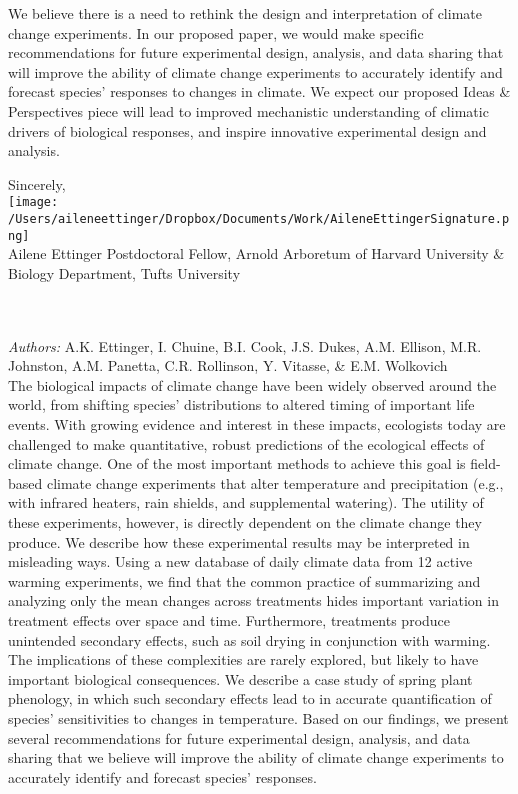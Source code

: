 \documentclass[12pt,a4paper]{letter}
\begin{document}
\begin{letter}{}
We believe there is a need to rethink the design and interpretation of climate change experiments. In our proposed paper, we would make specific recommendations for future experimental design, analysis, and data sharing that will improve the ability of climate change experiments to accurately identify and forecast species' responses to changes in climate. We expect our proposed Ideas \& Perspectives piece will lead to improved mechanistic understanding of climatic drivers of biological responses, and inspire innovative experimental design and analysis. 

Sincerely,\\

\texttt{[image: /Users/aileneettinger/Dropbox/Documents/Work/AileneEttingerSignature.png]} \\
Ailene Ettinger
Postdoctoral Fellow, Arnold Arboretum of Harvard University \& Biology Department, Tufts University

\newpage
{}\\
\\
\noindent \emph{Authors:} A.K. Ettinger, I. Chuine, B.I. Cook, J.S. Dukes, A.M. Ellison, M.R. Johnston, A.M. Panetta, C.R. Rollinson, Y. Vitasse, \& E.M. Wolkovich
\\
The biological impacts of climate change have been widely observed around the world, from shifting species' distributions to altered timing of important life events. With growing evidence and interest in these impacts, ecologists today are challenged to make quantitative, robust predictions of the ecological effects of climate change. One of the most important methods to achieve this goal is field-based climate change experiments that alter temperature and precipitation (e.g., with infrared heaters, rain shields, and supplemental watering). The utility of these experiments, however, is directly dependent on the climate change they produce. We describe how these experimental results may be interpreted in misleading ways. Using a new database of daily climate data from 12 active warming experiments, we find that the common practice of summarizing and analyzing only the mean changes across treatments hides important variation in treatment effects over space and time. Furthermore, treatments produce unintended secondary effects, such as soil drying in conjunction with warming. The implications of these complexities are rarely explored, but likely to have important biological consequences. We describe a case study of spring plant phenology, in which such secondary effects lead to in accurate quantification of species' sensitivities to changes in temperature. Based on our findings, we present several recommendations for future experimental design, analysis, and data sharing that we believe will improve the ability of climate change experiments to accurately identify and forecast species' responses.
\end{letter}
\end{document}
